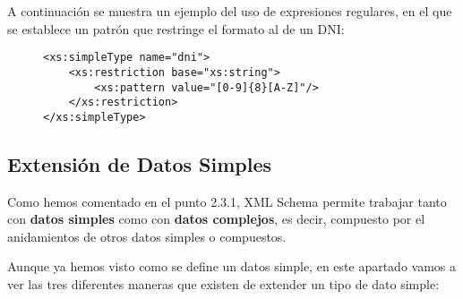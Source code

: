 \begin{itemize}
    A continuación se muestra un ejemplo del uso de expresiones regulares, en el que se establece un patrón que restringe el formato al de un DNI:

    \begin{figure}[H]
        \begin{tcolorbox}[sharp corners, colback=yellow!30, colframe=white!20]
            \scriptsize
            \begin{verbatim}
<xs:simpleType name="dni">
    <xs:restriction base="xs:string">
        <xs:pattern value="[0-9]{8}[A-Z]"/>
    </xs:restriction>
</xs:simpleType>
            \end{verbatim}
        \end{tcolorbox}
    \end{figure}
\end{itemize}

\subsection{Extensión de Datos Simples	}
Como hemos comentado en el punto 2.3.1, XML Schema permite trabajar tanto con \textbf{datos simples} como con \textbf{datos complejos}, es decir, compuesto por el anidamientos de otros datos simples o compuestos.

Aunque ya hemos visto como se define un datos simple, en este apartado vamos a ver las tres diferentes maneras que existen de extender un tipo de dato simple:

